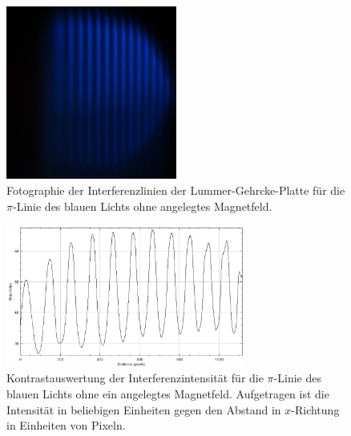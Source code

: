 \begin{figure}
  \centering
  \includegraphics[width=0.5\textwidth]{bilder/3001_BLAU_0mT_pi.jpg}
  \caption{Fotographie der Interferenzlinien der Lummer-Gehrcke-Platte für die $\pi$-Linie des blauen Lichts ohne angelegtes Magnetfeld.}
  \label{abb:piblau0mT}
\end{figure}
\begin{figure}
  \centering
  \includegraphics[width=0.7\textwidth]{bilder/pi_BLAU_0mT.PNG}
  \caption{Kontrastauswertung der Interferenzintensität für die $\pi$-Linie des blauen Lichts ohne ein angelegtes Magnetfeld. Aufgetragen ist die Intensität in beliebigen Einheiten gegen den Abstand in $x$-Richtung in Einheiten von Pixeln.}
  \label{abb:plotpiblau0mT}
\end{figure}
